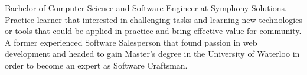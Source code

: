 
\begin{cvparagraph}
{Bachelor of Computer Science and Software Engineer at Symphony Solutions. Practice learner that interested in challenging tasks and learning new technologies or tools that could be applied in practice and bring effective value for community. A former experienced Software Salesperson that found passion in web development and headed to gain Master's degree in the University of Waterloo in order to become an expert as Software Craftsman.}
\end{cvparagraph}
